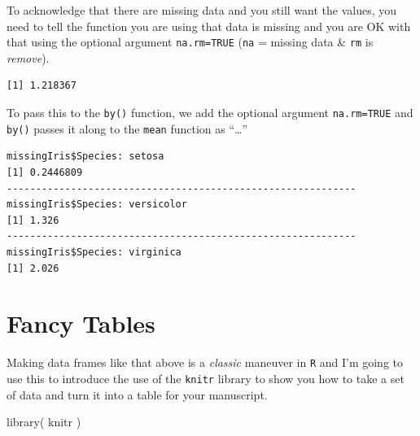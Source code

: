\documentclass[
  letterpaper,
]{book}
\newenvironment{Shaded}{\begin{snugshade}}{\end{snugshade}}
\newcommand{\AttributeTok}[1]{\textcolor[rgb]{0.40,0.45,0.13}{#1}}
\newcommand{\ConstantTok}[1]{\textcolor[rgb]{0.56,0.35,0.01}{#1}}
\newcommand{\FunctionTok}[1]{\textcolor[rgb]{0.28,0.35,0.67}{#1}}
\newcommand{\NormalTok}[1]{\textcolor[rgb]{0.00,0.23,0.31}{#1}}
\newcommand{\SpecialCharTok}[1]{\textcolor[rgb]{0.37,0.37,0.37}{#1}}
\begin{document}
To acknowledge that there are missing data and you still want the
values, you need to tell the function you are using that data is missing
and you are OK with that using the optional argument \texttt{na.rm=TRUE}
(\texttt{na} = missing data \& \texttt{rm} is \emph{remove}).

\begin{Shaded}
\end{Shaded}

\begin{verbatim}
[1] 1.218367
\end{verbatim}

To pass this to the \texttt{by()} function, we add the optional argument
\texttt{na.rm=TRUE} and \texttt{by()} passes it along to the
\texttt{mean} function as ``\ldots{}''

\begin{Shaded}
\end{Shaded}

\begin{verbatim}
missingIris$Species: setosa
[1] 0.2446809
------------------------------------------------------------ 
missingIris$Species: versicolor
[1] 1.326
------------------------------------------------------------ 
missingIris$Species: virginica
[1] 2.026
\end{verbatim}

\section{Fancy Tables}\label{fancy-tables}

Making data frames like that above is a \emph{classic} maneuver in
\texttt{R} and I'm going to use this to introduce the use of the
\texttt{knitr} library to show you how to take a set of data and turn it
into a table for your manuscript.

\begin{Shaded}
\begin{Highlighting}[]
\FunctionTok{library}\NormalTok{( knitr )}
\end{Highlighting}
\end{Shaded}
\end{document}
